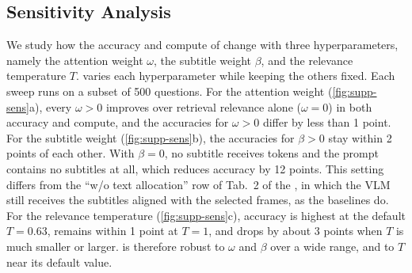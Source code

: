 \subsection{Sensitivity Analysis}
\label{sec:supp-sens}

We study how the accuracy and compute of \name change with three hyperparameters, namely the attention weight $\omega$, the subtitle weight $\beta$, and the relevance temperature $T$.  varies each hyperparameter while keeping the others fixed. Each sweep runs on a subset of 500 questions. For the attention weight (\cref{fig:supp-sens}a), every $\omega>0$ improves over retrieval relevance alone ($\omega=0$) in both accuracy and compute, and the accuracies for $\omega>0$ differ by less than 1 point. For the subtitle weight (\cref{fig:supp-sens}b), the accuracies for $\beta>0$ stay within 2 points of each other. With $\beta=0$, no subtitle receives tokens and the prompt contains no subtitles at all, which reduces accuracy by 12 points. This setting differs from the ``w/o text allocation'' row of Tab.~2 of the \mainpaper, in which the VLM still receives the subtitles aligned with the selected frames, as the baselines do. For the relevance temperature (\cref{fig:supp-sens}c), accuracy is highest at the default $T=0.63$, remains within 1 point at $T=1$, and drops by about 3 points when $T$ is much smaller or larger. \name is therefore robust to $\omega$ and $\beta$ over a wide range, and to $T$ near its default value.
